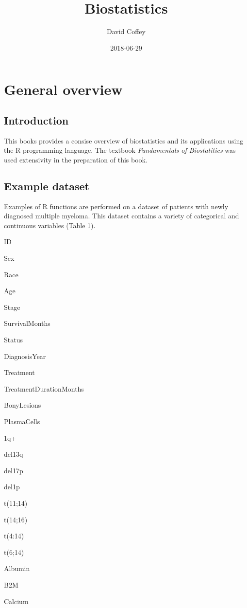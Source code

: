 \documentclass[]{book}
\title{Biostatistics}
\author{David Coffey}
\date{2018-06-29}
\theoremstyle{definition}
\theoremstyle{definition}
\theoremstyle{definition}
\theoremstyle{remark}
\begin{document}
\maketitle

{
\setcounter{tocdepth}{1}
\tableofcontents
}
\chapter{General overview}\label{general-overview}

\section{Introduction}\label{introduction}

This books provides a consise overview of biostatistics and its
applications using the R programming language. The textbook
\emph{Fundamentals of Biostatitics} \citep{Rosner2016} was used
extensivity in the preparation of this book.

\section{Example dataset}\label{example-dataset}

Examples of R functions are performed on a dataset of patients with
newly diagnosed multiple myeloma. This dataset contains a variety of
categorical and continuous variables (Table 1).

ID

Sex

Race

Age

Stage

SurvivalMonths

Status

DiagnosisYear

Treatment

TreatmentDurationMonths

BonyLesions

PlasmaCells

1q+

del13q

del17p

del1p

t(11;14)

t(14;16)

t(4:14)

t(6;14)

Albumin

B2M

Calcium
\end{document}
